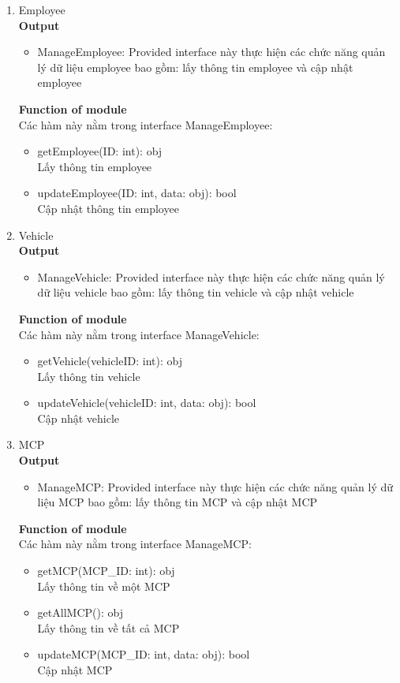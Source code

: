 \documentclass[a4paper]{article}
\begin{document}
\begin{enumerate}
           \item Employee \\
  \textbf{Output}
   \begin{itemize}
     \item  ManageEmployee: Provided interface này thực hiện các chức năng quản lý dữ liệu employee bao
gồm: lấy thông tin employee và cập nhật employee
 \end{itemize}
  \textbf{Function of module}\\
  Các hàm này nằm trong interface ManageEmployee:
     \begin{itemize}
\item getEmployee(ID: int): obj
\\ Lấy thông tin employee
\item updateEmployee(ID: int, data: obj): bool
\\ Cập nhật thông tin employee



 \end{itemize}
 
            \item Vehicle \\
  \textbf{Output}
   \begin{itemize}
     \item ManageVehicle: Provided interface này thực hiện các chức năng quản lý dữ liệu vehicle bao gồm:
lấy thông tin vehicle và cập nhật vehicle
 \end{itemize}
  \textbf{Function of module}\\
  Các hàm này nằm trong interface ManageVehicle:
     \begin{itemize}
\item getVehicle(vehicleID: int): obj
\\ Lấy thông tin vehicle
\item updateVehicle(vehicleID: int, data: obj): bool
\\ Cập nhật vehicle



 \end{itemize}
 
             \item MCP \\
  \textbf{Output}
   \begin{itemize}
     \item ManageMCP: Provided interface này thực hiện các chức năng quản lý dữ liệu MCP bao gồm: lấy
thông tin MCP và cập nhật MCP
 \end{itemize}
  \textbf{Function of module}\\
  Các hàm này nằm trong interface ManageMCP:
     \begin{itemize}
\item getMCP(MCP\_ID: int): obj
\\ Lấy thông tin về một MCP
\item getAllMCP(): obj
\\ Lấy thông tin về tất cả MCP
\item updateMCP(MCP\_ID: int, data: obj): bool
\\ Cập nhật MCP



\end{itemize}
\end{enumerate}
\end{document}
